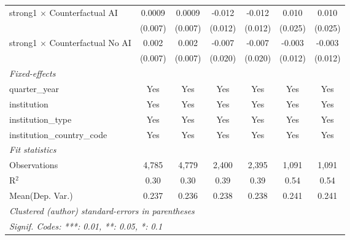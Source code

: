 \begin{tabular}{lcccccc}
   strong1 $\times$ Counterfactual AI     & 0.0009       & 0.0009       & -0.012  & -0.012  & 0.010   & 0.010\\   
                                          & (0.007)      & (0.007)      & (0.012) & (0.012) & (0.025) & (0.025)\\   
   strong1 $\times$ Counterfactual No AI  & 0.002        & 0.002        & -0.007  & -0.007  & -0.003  & -0.003\\   
                                          & (0.007)      & (0.007)      & (0.020) & (0.020) & (0.012) & (0.012)\\   
   \midrule
   \emph{Fixed-effects}\\
   quarter\_year                          & Yes          & Yes          & Yes     & Yes     & Yes     & Yes\\  
   institution                            & Yes          & Yes          & Yes     & Yes     & Yes     & Yes\\  
   institution\_type                      & Yes          & Yes          & Yes     & Yes     & Yes     & Yes\\  
   institution\_country\_code             & Yes          & Yes          & Yes     & Yes     & Yes     & Yes\\  
   \midrule
   \emph{Fit statistics}\\
   Observations                           & 4,785        & 4,779        & 2,400   & 2,395   & 1,091   & 1,091\\  
   R$^2$                                  & 0.30         & 0.30         & 0.39    & 0.39    & 0.54    & 0.54\\  
Mean(Dep. Var.) & 0.237 & 0.236 & 0.238 & 0.238 & 0.241 & 0.241 \\
   \midrule \midrule
   \multicolumn{7}{l}{\emph{Clustered (author) standard-errors in parentheses}}\\
   \multicolumn{7}{l}{\emph{Signif. Codes: ***: 0.01, **: 0.05, *: 0.1}}\\
\end{tabular}
\par\endgroup
